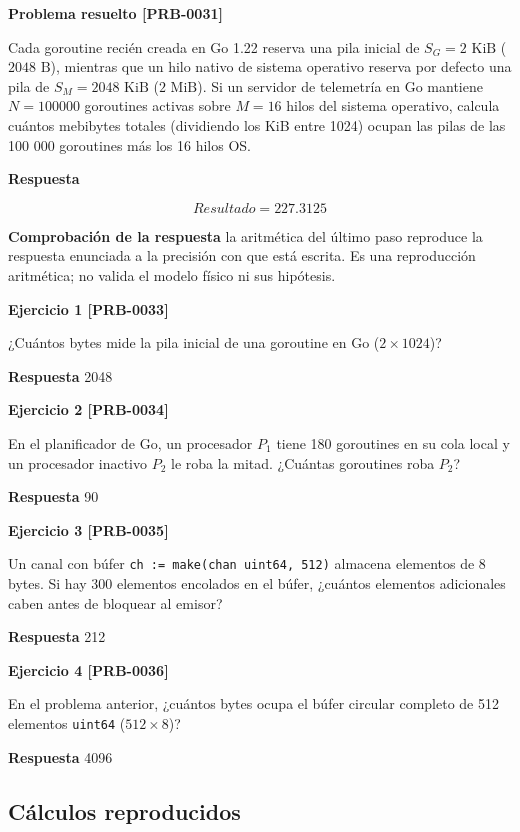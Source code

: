 \documentclass{book}
\begin{document}
\noindent\textbf{Problema resuelto [PRB-0031]}

Cada goroutine recién creada en Go 1.22 reserva una pila inicial de \(S_G = 2\text{ KiB}\) (\(2048\text{ B}\)), mientras que un hilo nativo de sistema operativo reserva por defecto una pila de \(S_M = 2048\text{ KiB}\) (\(2\text{ MiB}\)). Si un servidor de telemetría en Go mantiene \(N = 100000\) goroutines activas sobre \(M = 16\) hilos del sistema operativo, calcula cuántos mebibytes totales (dividiendo los KiB entre 1024) ocupan las pilas de las 100 000 goroutines más los 16 hilos OS.

\noindent\textbf{Respuesta}

\[
Resultado = 227.3125
\]

\noindent\textbf{Comprobación de la respuesta} la aritmética del último paso reproduce la respuesta enunciada a la precisión con que está escrita. Es una reproducción aritmética; no valida el modelo físico ni sus hipótesis.

\noindent\textbf{Ejercicio 1 [PRB-0033]}

¿Cuántos bytes mide la pila inicial de una goroutine en Go (\(2 \times 1024\))?

\noindent\textbf{Respuesta} 2048

\noindent\textbf{Ejercicio 2 [PRB-0034]}

En el planificador de Go, un procesador \(P_1\) tiene 180 goroutines en su cola local y un procesador inactivo \(P_2\) le roba la mitad. ¿Cuántas goroutines roba \(P_2\)?

\noindent\textbf{Respuesta} 90

\noindent\textbf{Ejercicio 3 [PRB-0035]}

Un canal con búfer \texttt{ch := make(chan uint64, 512)} almacena elementos de 8 bytes. Si hay 300 elementos encolados en el búfer, ¿cuántos elementos adicionales caben antes de bloquear al emisor?

\noindent\textbf{Respuesta} 212

\noindent\textbf{Ejercicio 4 [PRB-0036]}

En el problema anterior, ¿cuántos bytes ocupa el búfer circular completo de 512 elementos \texttt{uint64} (\(512 \times 8\))?

\noindent\textbf{Respuesta} 4096

\subsection*{Cálculos reproducidos}
\end{document}
